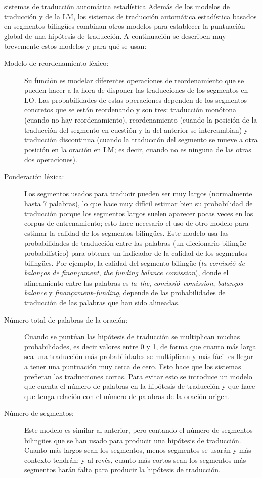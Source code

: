 \begin{persabermes}{sistemas de traducción automática estadística} Además de los modelos de traducción y de la LM, los sistemas de traducción automática estadística basados en segmentos bilingües combinan otros modelos para establecer la puntuación global de una hipótesis de traducción. A continuación se describen muy brevemente estos modelos y para qué se usan: \begin{description} \item[Modelo de reordenamiento léxico:] Su función es modelar diferentes operaciones de reordenamiento que se pueden hacer a la hora de disponer las traducciones de los segmentos en LO. Las probabilidades de estas operaciones dependen de los segmentos concretos que se están reordenando y son tres: traducción monótona (cuando no hay reordenamiento), reordenamiento (cuando la posición de la traducción del segmento en cuestión y la del anterior se intercambian) y traducción discontinua (cuando la traducción del segmento se mueve a otra posición en la oración en LM; es decir, cuando no es ninguna de las otras dos operaciones). \item[Ponderación léxica:] Los segmentos usados para traducir pueden ser muy largos (normalmente hasta 7 palabras), lo que hace muy difícil estimar bien su probabilidad de traducción porque los segmentos largos suelen aparecer pocas veces en los corpus de entrenamiento; esto hace necesario el uso de otro modelo para estimar la calidad de los segmentos bilingües. Este modelo usa las probabilidades de traducción entre las palabras (un diccionario bilingüe probabilístico) para obtener un indicador de la calidad de los segmentos bilingües. Por ejemplo, la calidad del segmento bilingüe (\emph{la comissió de balanços de finançament}, \emph{the funding balance comission}), donde el alineamiento entre las palabras es \emph{la}--\emph{the}, \emph{comissió}--\emph{comission}, \emph{balanços}--\emph{balance} y \emph{finançament}--\emph{funding}, depende de las probabilidades de traducción de las palabras que han sido alineadas. \item[Número total de palabras de la oración:] Cuando se puntúan las hipótesis de traducción se multiplican muchas probabilidades, es decir valores entre 0 y 1, de forma que cuanto más larga sea una traducción más probabilidades se multiplican y más fácil es llegar a tener una puntuación muy cerca de cero. Esto hace que los sistemas prefieran las traducciones cortas. Para evitar esto se introduce un modelo que cuenta el número de palabras en la hipótesis de traducción y que hace que tenga relación con el número de palabras de la oración origen. \item[Número de segmentos:] Este modelo es similar al anterior, pero contando el número de segmentos bilingües que se han usado para producir una hipótesis de traducción. Cuanto más largos sean los segmentos, menos segmentos se usarán y más contexto tendrán; y al revés, cuanto más cortos sean los segmentos más segmentos harán falta para producir la hipótesis de traducción. \end{description} 


\end{persabermes}
